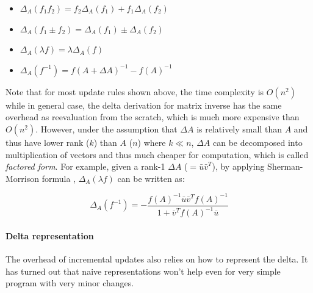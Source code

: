 \begin{center}
    \begin{minipage}{0.4\textwidth}
      \begin{itemize}
        \item $\Delta_A(f_1 f_2) = f_2\Delta_A(f_1) + f_1\Delta_A(f_2)$
        \item $\Delta_A(f_1 \pm f_2) = \Delta_A(f_1) \pm \Delta_A(f_2)$
        \item $\Delta_A(\lambda f) = \lambda \Delta_A(f)$
        \item $\Delta_A(f^{-1}) = f(A+\Delta A)^{-1}-f(A)^{-1}$
      \end{itemize}
    \end{minipage}
  \end{center}

Note that for most update rules shown above, the time complexity is $O(n^2)$ while in general case, the delta derivation for matrix inverse has the same overhead as reevaluation from the scratch, which is much more expensive than $O(n^2)$. However, under the assumption that $\Delta A$ is relatively small than $A$ and thus have lower rank ($k$) than $A$ ($n$) where $k \ll n$, $\Delta A$ can be decomposed into multiplication of vectors and thus much cheaper for computation, which is called {\em factored form}. For example, given a rank-1 $\Delta A$ ($=\bar{u}\bar{v}^T$), by applying Sherman-Morrison formula \cite{press2007numerical}, $\Delta_A(\lambda f)$ can be written as:

\begin{equation}\label{eq: matrix_inverse}
\Delta_A(f^{-1}) = -\frac{f(A)^{-1}\bar{u}\bar{v}^Tf(A)^{-1}}{1+\bar{v}^Tf(A)^{-1}\bar{u}}
\end{equation}

\paragraph{Delta representation}
The overhead of incremental updates also relies on how to represent the delta. It has turned out that naive representations won't help even for very simple program with very minor changes. 

